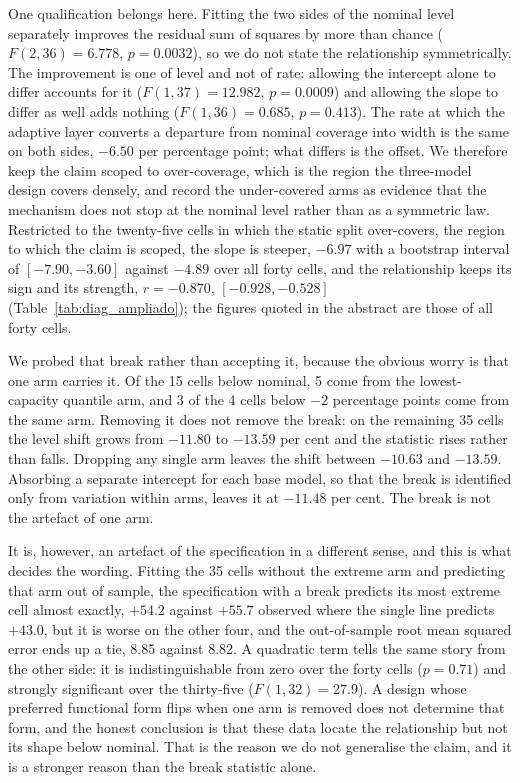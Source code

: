 \documentclass[preprint,3p,times]{elsarticle}
\begin{document}
One qualification belongs here. Fitting the two sides of the nominal level separately improves the residual sum of squares by more than chance ($F(2,36)=6.778$, $p=0.0032$), so we do not state the relationship symmetrically. The improvement is one of level and not of rate: allowing the intercept alone to differ accounts for it ($F(1,37)=12.982$, $p=0.0009$) and allowing the slope to differ as well adds nothing ($F(1,36)=0.685$, $p=0.413$). The rate at which the adaptive layer converts a departure from nominal coverage into width is the same on both sides, $-6.50$ per percentage point; what differs is the offset. We therefore keep the claim scoped to over-coverage, which is the region the three-model design covers densely, and record the under-covered arms as evidence that the mechanism does not stop at the nominal level rather than as a symmetric law. Restricted to the twenty-five cells in which the static split over-covers, the region to which the claim is scoped, the slope is steeper, $-6.97$ with a bootstrap interval of $[-7.90, -3.60]$ against $-4.89$ over all forty cells, and the relationship keeps its sign and its strength, $r=-0.870$, $[-0.928, -0.528]$ (Table~\ref{tab:diag_ampliado}); the figures quoted in the abstract are those of all forty cells.

We probed that break rather than accepting it, because the obvious worry is that one arm carries it. Of the 15 cells below nominal, 5 come from the lowest-capacity quantile arm, and 3 of the 4 cells below $-2$ percentage points come from the same arm. Removing it does not remove the break: on the remaining 35 cells the level shift grows from $-11.80$ to $-13.59$ per cent and the statistic rises rather than falls. Dropping any single arm leaves the shift between $-10.63$ and $-13.59$. Absorbing a separate intercept for each base model, so that the break is identified only from variation within arms, leaves it at $-11.48$ per cent. The break is not the artefact of one arm.

It is, however, an artefact of the specification in a different sense, and this is what decides the wording. Fitting the 35 cells without the extreme arm and predicting that arm out of sample, the specification with a break predicts its most extreme cell almost exactly, $+54.2$ against $+55.7$ observed where the single line predicts $+43.0$, but it is worse on the other four, and the out-of-sample root mean squared error ends up a tie, 8.85 against 8.82. A quadratic term tells the same story from the other side: it is indistinguishable from zero over the forty cells ($p=0.71$) and strongly significant over the thirty-five ($F(1,32)=27.9$). A design whose preferred functional form flips when one arm is removed does not determine that form, and the honest conclusion is that these data locate the relationship but not its shape below nominal. That is the reason we do not generalise the claim, and it is a stronger reason than the break statistic alone.
\end{document}
